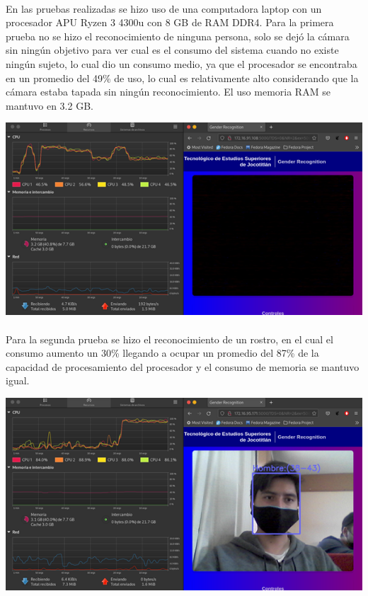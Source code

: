 \documentclass[9pt]{report}
\newenvironment{Figura}
  {\par\medskip\noindent\minipage{\linewidth}}
  {\endminipage\par\medskip}
\begin{document}
\begin{multicols}{2}
	\paragraph{}
	En las pruebas realizadas se hizo uso de una computadora laptop con un procesador APU Ryzen 3 4300u con 8 GB de RAM DDR4. Para la primera prueba no se hizo el reconocimiento de ninguna persona, solo se dejó la cámara sin ningún objetivo para ver cual es el consumo del sistema cuando no existe ningún sujeto, lo cual dio un consumo medio, ya que el procesador se encontraba en un promedio del 49\% de uso, lo cual es relativamente alto considerando que la cámara estaba tapada sin ningún reconocimiento. El uso memoria RAM se mantuvo en 3.2 GB.
	\begin{Figura}
		\includegraphics[width=\textwidth]{7}
		\label{figura8}
	\end{Figura}
	\paragraph{}
	Para la segunda prueba se hizo el reconocimiento de un rostro, en el cual el consumo aumento un 30\% llegando a ocupar un promedio del 87\% de la capacidad de procesamiento del procesador y el consumo de memoria se mantuvo igual.
	\begin{Figura}
		\includegraphics[width=\textwidth]{8}
		\label{figura9}
	\end{Figura}

\end{multicols}
\end{document}
